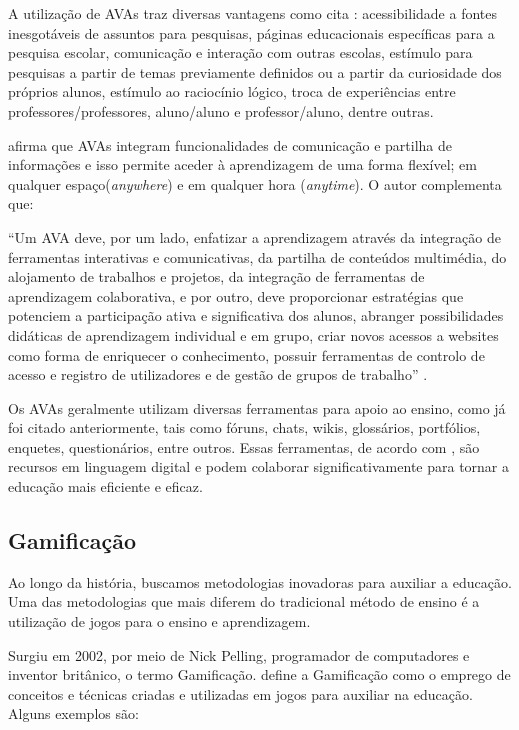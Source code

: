 A utilização de AVAs traz diversas vantagens como cita : acessibilidade a fontes inesgotáveis de assuntos para pesquisas, páginas educacionais específicas para a pesquisa escolar, comunicação e interação com outras escolas, estímulo para pesquisas a partir de temas previamente definidos ou a partir da curiosidade dos próprios alunos, estímulo ao raciocínio lógico, troca de experiências entre professores/professores, aluno/aluno e professor/aluno, dentre outras.

 afirma que AVAs integram funcionalidades de comunicação e partilha de informações e isso permite aceder à aprendizagem de uma forma flexível; em qualquer espaço(\textit{anywhere}) e em qualquer hora (\textit{anytime}). O autor complementa que:

\begin{citacao}
``Um AVA deve, por um lado, enfatizar a aprendizagem através da integração de ferramentas interativas e comunicativas, da partilha de conteúdos multimédia, do alojamento de trabalhos e projetos, da integração de ferramentas de aprendizagem colaborativa, e por outro, deve proporcionar estratégias que potenciem a participação ativa e significativa dos alunos, abranger possibilidades didáticas de aprendizagem individual e em grupo, criar novos acessos a websites como forma de enriquecer o conhecimento, possuir ferramentas de controlo de acesso e registro de utilizadores e de gestão de grupos de trabalho'' \cite[p.~41]{carvalho2013ambiente}. 
\end{citacao}

Os AVAs  geralmente utilizam diversas ferramentas para apoio ao ensino, como já foi citado anteriormente, tais como fóruns, chats, wikis, glossários, portfólios, enquetes, questionários, entre outros. Essas ferramentas, de acordo com , são recursos em linguagem digital e podem colaborar significativamente para tornar a educação mais eficiente e eficaz.

\subsection{Gamificação}

Ao longo da história, buscamos metodologias inovadoras para auxiliar a educação. Uma das metodologias que mais diferem do tradicional método de ensino é a utilização de jogos para o ensino e aprendizagem. 

Surgiu em 2002, por meio de Nick Pelling, programador de computadores e inventor britânico, o termo Gamificação.  define a Gamificação como o emprego de conceitos e 
técnicas criadas e utilizadas em jogos para auxiliar na educação. Alguns exemplos s\~ao:


